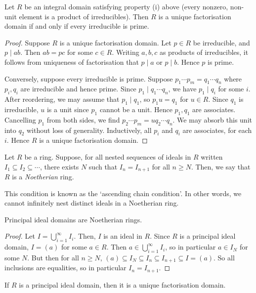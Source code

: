 \begin{proposition}
	Let $R$ be an integral domain satisfying property (i) above (every nonzero, non-unit element is a product of irreducibles).
	Then $R$ is a unique factorisation domain if and only if every irreducible is prime.
\end{proposition}

\begin{proof}
	Suppose $R$ is a unique factorisation domain.
	Let $p \in R$ be irreducible, and $p \mid ab$.
	Then $ab = pc$ for some $c \in R$.
	Writing $a, b, c$ as products of irreducibles, it follows from uniqueness of factorisation that $p \mid a$ or $p \mid b$.
	Hence $p$ is prime.

	Conversely, suppose every irreducible is prime.
	Suppose $p_1 \cdots p_m = q_1 \cdots q_n$ where $p_i, q_i$ are irreducible and hence prime.
	Since $p_1 \mid q_1 \cdots q_n$, we have $p_1 \mid q_i$ for some $i$.
	After reordering, we may assume that $p_1 \mid q_1$, so $p_1 u = q_1$ for $u \in R$.
	Since $q_1$ is irreducible, $u$ is a unit since $p_1$ cannot be a unit.
	Hence $p_1, q_1$ are associates.
	Cancelling $p_1$ from both sides, we find $p_2 \cdots p_m = u q_2 \cdots q_n$.
	We may absorb this unit into $q_2$ without loss of generality.
	Inductively, all $p_i$ and $q_i$ are associates, for each $i$.
	Hence $R$ is a unique factorisation domain.
\end{proof}
\begin{definition}
	Let $R$ be a ring.
	Suppose, for all nested sequences of ideals in $R$ written $I_1 \subseteq I_2 \subseteq \cdots$, there exists $N$ such that $I_n = I_{n+1}$ for all $n \geq N$.
	Then, we say that $R$ is a \textit{Noetherian} ring.
\end{definition}
This condition is known as the `ascending chain condition'.
In other words, we cannot infinitely nest distinct ideals in a Noetherian ring.
\begin{lemma}
	Principal ideal domains are Noetherian rings.
\end{lemma}
\begin{proof}
	Let $I = \bigcup_{i=1}^\infty I_i$.
	Then, $I$ is an ideal in $R$.
	Since $R$ is a principal ideal domain, $I = (a)$ for some $a \in R$.
	Then $a \in \bigcup_{i=1}^\infty I_i$, so in particular $a \in I_N$ for some $N$.
	But then for all $n \geq N$, $(a) \subseteq I_N \subseteq I_{n} \subseteq I_{n+1} \subseteq I = (a)$.
	So all inclusions are equalities, so in particular $I_n = I_{n+1}$.
\end{proof}
\begin{theorem}
	If $R$ is a principal ideal domain, then it is a unique factorisation domain.
\end{theorem}
